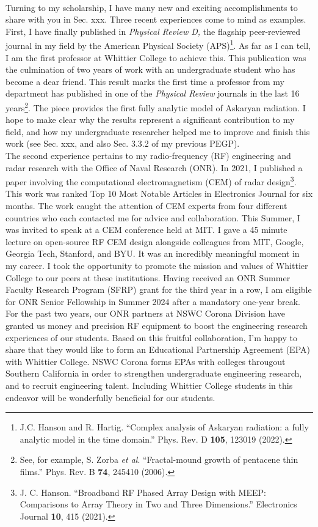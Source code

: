 \documentclass[../../main.tex]{subfiles}
\begin{document}
\\
\vspace{0.25cm}
Turning to my scholarship, I have many new and exciting accomplishments to share with you in Sec. xxx.  Three recent experiences come to mind as examples.  First, I have finally published in \textit{Physical Review D,} the flagship peer-reviewed journal in my field by the American Physical Society (APS)\footnote{J.C. Hanson and R. Hartig. ``Complex analysis of Askaryan radiation: a fully analytic model in the time domain.'' Phys. Rev. D \textbf{105}, 123019 (2022).}.  As far as I can tell, I am the first professor at Whittier College to achieve this.  This publication was the culmination of two years of work with an undergraduate student who has become a dear friend.  This result marks the first time a professor from my department has published in one of the \textit{Physical Review} journals in the last 16 years\footnote{See, for example, S. Zorba \textit{et al}. ``Fractal-mound growth of pentacene thin films.'' Phys. Rev. B \textbf{74}, 245410 (2006).}.  The piece provides the first fully analytic model of Askaryan radiation.  I hope to make clear why the results represent a significant contribution to my field, and how my undergraduate researcher helped me to improve and finish this work (see Sec. xxx, and also Sec. 3.3.2 of my previous PEGP).
\\
\vspace{0.25cm}
The second experience pertains to my radio-frequency (RF) engineering and radar research with the Office of Naval Research (ONR).  In 2021, I published a paper involving the computational electromagnetism (CEM) of radar design\footnote{J. C. Hanson.  ``Broadband RF Phased Array Design with MEEP: Comparisons to Array Theory in Two and Three Dimensions.'' Electronics Journal \textbf{10}, 415 (2021).}.  This work was ranked Top 10 Most Notable Articles in Electronics Journal for six months.  The work caught the attention of CEM experts from four different countries who each contacted me for advice and collaboration.  This Summer, I was invited to speak at a CEM conference held at MIT.  I gave a 45 minute lecture on open-source RF CEM design alongside colleagues from MIT, Google, Georgia Tech, Stanford, and BYU.  It was an incredibly meaningful moment in my career.  I took the opportunity to promote the mission and values of Whittier College to our peers at these institutions.  Having received an ONR Summer Faculty Research Program (SFRP) grant for the third year in a row, I am eligible for ONR Senior Fellowship in Summer 2024 after a mandatory one-year break.  For the past two years, our ONR partners at NSWC Corona Division have granted us money and precision RF equipment to boost the engineering research experiences of our students.  Based on this fruitful collaboration, I'm happy to share that they would like to form an Educational Partnership Agreement (EPA) with Whittier College.  NSWC Corona forms EPAs with colleges througout Southern California in order to strengthen undergraduate engineering research, and to recruit engineering talent.  Including Whittier College students in this endeavor will be wonderfully beneficial for our students.
\end{document}
